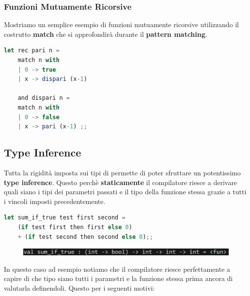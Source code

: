 \documentclass{article}
\begin{document}
\vspace*{20px}

\subsubsection{Funzioni Mutuamente Ricorsive}
Mostriamo un semplice esempio di funzioni mutuamente ricorsive utilizzando il costrutto \textbf{match} che si approfondirà durante il \textbf{pattern matching}.

\vspace*{10px}
\begin{lstlisting}[language = JavaScript]
    let rec pari n =
    match n with
    | 0 -> true
    | x -> dispari (x-1)
    
    and dispari n =
    match n with
    | 0 -> false
    | x -> pari (x-1) ;;
\end{lstlisting}
\vspace*{-10px}

\newpage

\subsection{Type Inference}

Tutta la rigidità imposta sui tipi di permette di poter sfruttare un potentissimo \textbf{type inference}. Questo perchè \textbf{staticamente} il compilatore riesce a derivare quali siano i tipi dei parametri passati e il tipo della funzione stessa grazie a tutti i vincoli imposti precedentemente.

\vspace*{10px}
\begin{lstlisting}[language = JavaScript]
    let sum_if_true test first second =
    (if test first then first else 0)
    + (if test second then second else 0);;
\end{lstlisting}

\vspace*{-20px}

\begin{figure}[htbp]
    \center
    \includegraphics[scale=0.4]{img/typeInference1.png}
\end{figure}

In questo caso ad esempio notiamo che il compilatore riesce perfettamente a capire di che tipo siano tutti i parametri e la funzione stessa prima ancora di valutarla definendoli. Questo per i seguenti motivi:
\end{document}
